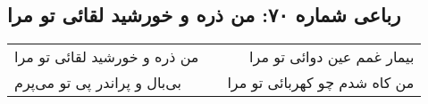 \begin{center}
\section*{رباعی شماره ۷۰: من ذره و خورشید لقائی تو مرا}
\label{sec:0070}
\begin{longtable}{l p{0.5cm} r}
من ذره و خورشید لقائی تو مرا
&&
بیمار غمم عین دوائی تو مرا
\\
بی‌بال و پراندر پی تو می‌پرم
&&
من کاه شدم چو کهربائی تو مرا
\\
\end{longtable}
\end{center}
